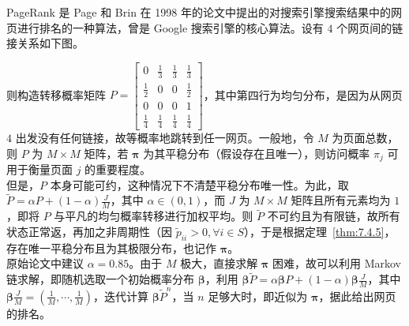 \documentclass[../main.tex]{subfiles}
\begin{document}
\begin{example}
    PageRank 是 Page 和 Brin 在 1998 年的论文中提出的对搜索引擎搜索结果中的网页进行排名的一种算法，曾是 Google 搜索引擎的核心算法。设有 $4$ 个网页间的链接关系如下图。
    \begin{center}
    \end{center}
    \bigskip
    则构造转移概率矩阵 $P=
        \left[\begin{matrix}
                0   & \frac13 & \frac13 & \frac13       \\
                \frac12   & 0       & 0       & \frac12       \\
                0   & 0       & 0       & 1       \\
                \frac14 & \frac14 & \frac14       & \frac14
            \end{matrix}\right]$，其中第四行为均匀分布，是因为从网页 $4$ 出发没有任何链接，故等概率地跳转到任一网页。一般地，令 $M$ 为页面总数，则 $P$ 为 $M\times M$ 矩阵，若 $\boldsymbol\pi$ 为其平稳分布（假设存在且唯一），则访问概率 $\pi_j$ 可用于衡量页面 $j$ 的重要程度。\\
            但是，$P$ 本身可能可约，这种情况下不清楚平稳分布唯一性。为此，取 $\tilde P=\alpha P+(1-\alpha)\frac JM$，其中 $\alpha\in(0,1)$，而 $J$ 为 $M\times M$ 矩阵且所有元素均为 $1$，即将 $P$ 与平凡的均匀概率转移进行加权平均。则 $\tilde P$ 不可约且为有限链，故所有状态正常返，再加之非周期性（因 $\tilde p_{ii}>0,\forall i\in S$），于是根据定理~\ref{thm:7.4.5}，存在唯一平稳分布且为其极限分布，也记作 $\boldsymbol\pi$。\\
            原始论文中建议 $\alpha=0.85$。由于 $M$ 极大，直接求解 $\boldsymbol\pi$ 困难，故可以利用 Markov 链求解，即随机选取一个初始概率分布 $\boldsymbol\beta$，利用 $\boldsymbol\beta\tilde P=\alpha\boldsymbol\beta P+(1-\alpha)\boldsymbol\beta\frac JM$，其中 $\boldsymbol\beta\frac JM=(\frac1M,\cdots,\frac1M)$，迭代计算 $\boldsymbol\beta\tilde P^n$，当 $n$ 足够大时，即近似为 $\boldsymbol\pi$，据此给出网页的排名。
\end{example}
\end{document}
